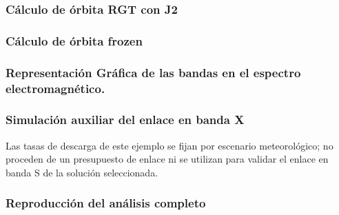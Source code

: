 \newpage
\subsubsection{Cálculo de órbita RGT con J2}



\newpage
\subsubsection{Cálculo de órbita frozen}




\newpage
\subsubsection{Representación Gráfica de las bandas en el espectro electromagnético.}


\newpage
\subsubsection{Simulación auxiliar del enlace en banda X}
Las tasas de descarga de este ejemplo se fijan por escenario meteorológico; no proceden de un presupuesto de enlace ni se utilizan para validar el enlace en banda S de la solución seleccionada.


\newpage
\subsubsection{Reproducción del análisis completo}



